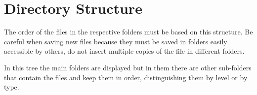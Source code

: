 \section{Directory Structure}
The order of the files in the respective folders must be based on this structure. Be careful when saving new files because they must be saved in folders easily accessible by others, do not insert multiple copies of the file in different folders.

\vspace*{0.5cm}

\vspace*{0.5cm}
In this tree the main folders are displayed but in them there are other sub-folders that contain the files and keep them in order, distinguishing them by level or by type.